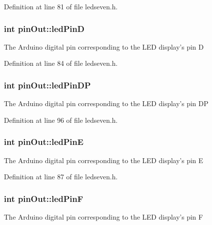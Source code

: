 Definition at line 81 of file ledseven.\+h.

\hypertarget{structpin_out_a7cf8e2fe62554d6edd30f6452a8c9a62}{
\subsubsection[{led\+Pin\+D}]{\setlength{\rightskip}{0pt plus 5cm}int pin\+Out\+::led\+Pin\+D}}\label{structpin_out_a7cf8e2fe62554d6edd30f6452a8c9a62}
The Arduino digital pin corresponding to the L\+E\+D display's pin D 

Definition at line 84 of file ledseven.\+h.

\hypertarget{structpin_out_a792d269e540bea0a98e97049975fc110}{
\subsubsection[{led\+Pin\+D\+P}]{\setlength{\rightskip}{0pt plus 5cm}int pin\+Out\+::led\+Pin\+D\+P}}\label{structpin_out_a792d269e540bea0a98e97049975fc110}
The Arduino digital pin corresponding to the L\+E\+D display's pin D\+P 

Definition at line 96 of file ledseven.\+h.

\hypertarget{structpin_out_a34d7db1c42f58d60de9e5f0e10a740a2}{
\subsubsection[{led\+Pin\+E}]{\setlength{\rightskip}{0pt plus 5cm}int pin\+Out\+::led\+Pin\+E}}\label{structpin_out_a34d7db1c42f58d60de9e5f0e10a740a2}
The Arduino digital pin corresponding to the L\+E\+D display's pin E 

Definition at line 87 of file ledseven.\+h.

\hypertarget{structpin_out_a56e435d512b1ef24ca847884487314b6}{
\subsubsection[{led\+Pin\+F}]{\setlength{\rightskip}{0pt plus 5cm}int pin\+Out\+::led\+Pin\+F}}\label{structpin_out_a56e435d512b1ef24ca847884487314b6}
The Arduino digital pin corresponding to the L\+E\+D display's pin F 

